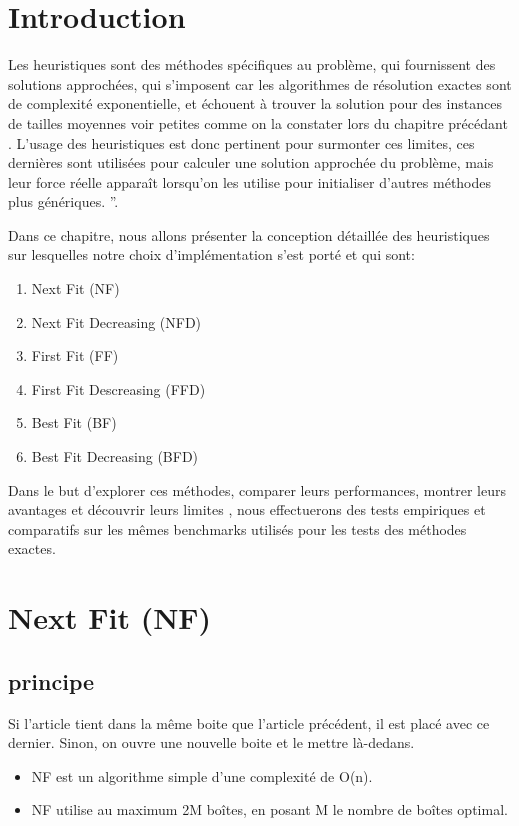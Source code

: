 \documentclass[class=article, crop=false]{standalone}
\begin{document}
\section{Introduction}
Les heuristiques sont des méthodes spécifiques au problème, qui fournissent des solutions approchées, qui s'imposent car les algorithmes de résolution exactes sont de complexité exponentielle,
et échouent à trouver la solution pour des instances de tailles moyennes voir petites comme on la constater lors du chapitre précédant .
L'usage des heuristiques est donc pertinent pour surmonter ces limites, ces dernières sont utilisées pour calculer une solution approchée du problème, 
mais leur force réelle apparaît lorsqu’on les utilise pour initialiser d’autres méthodes plus génériques. ”.

Dans ce chapitre, nous allons présenter la conception détaillée des heuristiques sur lesquelles notre choix d’implémentation s’est porté et qui sont:
\begin{enumerate}
    \item Next Fit (NF)
    \item Next Fit Decreasing (NFD)
    \item First Fit (FF)
    \item First Fit Descreasing (FFD)
    \item Best Fit (BF)
    \item Best Fit Decreasing (BFD)
\end{enumerate}

Dans le but d’explorer ces méthodes, comparer leurs performances, montrer leurs avantages et découvrir leurs limites , nous effectuerons des tests empiriques et comparatifs sur les mêmes  benchmarks utilisés pour les tests des méthodes exactes.
\newpage
\section{Next Fit (NF)}
\subsection{principe}
Si l'article tient dans la même boite que l'article précédent, il est placé avec ce dernier. Sinon, on ouvre une nouvelle boite et le mettre là-dedans.
\begin{itemize}
    \item NF est un algorithme simple d’une complexité de O(n). 
    \item NF utilise au maximum 2M boîtes, en posant M le nombre de boîtes optimal. 
\end{itemize}
\end{document}
